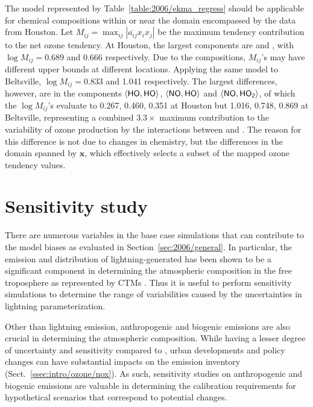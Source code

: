 The model represented by Table~\ref{table:2006/ekma_regress} should be applicable for chemical compositions within or near the domain encompassed by
the data from Houston. Let $M_{ij}=\max_{ij}|\overline{a_{ij}}x_ix_j|$ be the maximum tendency contribution to the net ozone tendency. At Houston, the
largest components are  and , with $\log M_{ij}=0.689$ and 0.666 respectively. Due to the compositions, $M_{ij}$'s may have different
upper bounds at different locations. Applying the same model to Beltsville, $\log M_{ij}=0.833$ and 1.041 respectively. The largest differences, however, are in
the components $\langle\chem{HO},\chem{HO}\rangle$, $\langle\chem{NO},\chem{HO}\rangle$ and $\langle\chem{NO},\chem{HO_2}\rangle$, of which the $\log
M_{ij}$'s evaluate to 0.267, 0.460, 0.351 at Houston but 1.016, 0.748, 0.869 at Beltsville, representing a combined $3.3\times$ maximum contribution to the
variability of ozone production by the interactions between  and . The reason for this difference is not due to changes in chemistry, but
the differences in the domain spanned by $\mathbf{x}$, which effectively selects a subset of the mapped ozone tendency values.

\section{Sensitivity study}\label{sec:2006/sens}

There are numerous variables in the base case simulations that can contribute to the model biases as evaluated in Section~\ref{sec:2006/general}. In
particular, the emission and distribution of lightning-generated  {\lnox} has been shown to be a significant component in determining the
atmospheric composition in the free troposphere as represented by CTMs \citep{Labrador:2005uq,Cooper:2009nx,Ott:2010lo}. Thus it is useful to perform
sensitivity simulations to determine the range of variabilities caused by the uncertainties in lightning parameterization.

Other than lightning emission, anthropogenic and biogenic emissions are also crucial in determining the atmospheric composition. While having a lesser
degree of uncertainty and sensitivity compared to {\lnox}, urban developments and policy changes can have substantial impacts on the emission inventory
(Sect.~\ref{ssec:intro/ozone/nox}). As such, sensitivity studies on anthropogenic and biogenic emissions are valuable in determining the calibration
requirements for hypothetical scenarios that correspond to potential changes.

